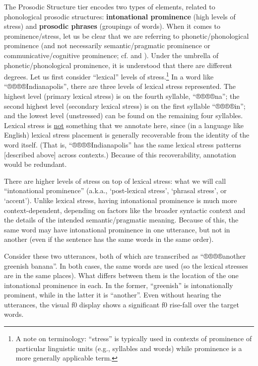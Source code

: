 \documentclass[11pt, twoside]{memoir}
\begin{document}
The Prosodic Structure tier encodes two types of elements, related to phonological prosodic structures: \textbf{intonational prominence} (high levels of stress) and \textbf{prosodic phrases} (groupings of words). When it comes to prominence\slash stress, let us be clear that we are referring to phonetic\slash phonological prominence (and not necessarily semantic\slash pragmatic prominence or communicative\slash cognitive prominence; cf. \citealt{gussenhoven15} and \citealt{wagner-15}). Under the umbrella of phonetic\slash phonological prominence, it is understood that there are different degrees. Let us first consider “lexical” levels of stress.\footnote{A note on terminology: “stress” is typically used in contexts of prominence of particular linguistic units (e.g., syllables and words) while prominence is a more generally applicable term.} In a word like “®®®®{Indianapolis}”, there are three levels of lexical stress represented. The highest level (primary lexical stress) is on the fourth syllable, “®®®®{na}”; the second highest level (secondary lexical stress) is on the first syllable “®®®®{in}”; and the lowest level (unstressed) can be found on the remaining four syllables. Lexical stress is \uline{not} something that we annotate here, since (in a language like English) lexical stress placement is generally recoverable from the identity of the word itself. (That is, “®®®®{Indianapolis}” has the same lexical stress patterns [described above] across contexts.) Because of this recoverability, annotation would be redundant.

There are higher levels of stress on top of lexical stress: what we will call “intonational prominence” (a.k.a., ‘post-lexical stress’, ‘phrasal stress’, or ‘accent’). Unlike lexical stress, having intonational prominence is much more context-dependent, depending on factors like the broader syntactic context and the details of the intended semantic\slash pragmatic meaning. Because of this, the same word may have intonational prominence in one utterance, but not in another (even if the sentence has the same words in the same order).

Consider these two utterances, both of which are transcribed as “®®®®{another greenish banana}”. In both cases, the same words are used (so the lexical stresses are in the same places). What differs between them is the location of the one intonational prominence in each. In the former, “greenish” is intonationally prominent, while in the latter it is “another”. Even without hearing the utterances, the visual f0 display shows a significant f0 rise-fall over the target words. 
\end{document}
